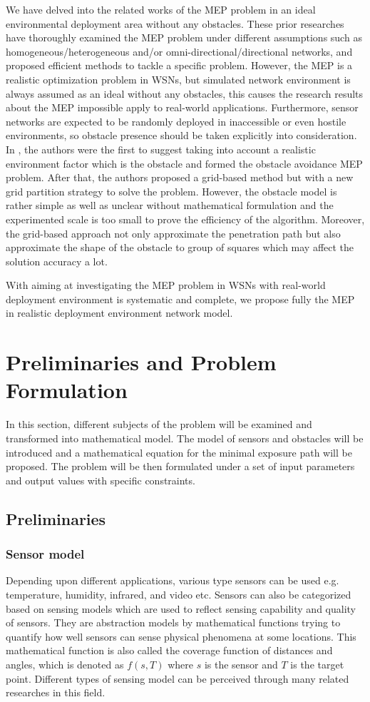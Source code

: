 \documentclass[final]{elsarticle}
\begin{document}
We have delved into the related works of the MEP problem in an ideal environmental deployment area without any obstacles. These prior researches have thoroughly examined the MEP problem under different assumptions such as homogeneous/heterogeneous and/or omni-directional/directional networks, and proposed efficient methods to tackle a specific problem. However, the MEP is a realistic optimization problem in WSNs, but simulated network environment is always assumed as an ideal without any obstacles, this causes the research results about the MEP impossible apply to real-world applications. Furthermore, sensor networks are expected to be randomly deployed in inaccessible or even hostile environments, so obstacle presence should be taken explicitly into consideration. In \cite{liu2017obstacle}, the authors were the first to suggest taking into account a realistic environment factor which is the obstacle and formed the obstacle avoidance MEP problem. After that, the authors proposed a grid-based method but with a new grid partition strategy to solve the problem. However, the obstacle model is rather simple as well as unclear without mathematical formulation and the experimented scale is too small to prove the efficiency of the algorithm. Moreover, the grid-based approach not only approximate the penetration path but also approximate the shape of the obstacle to group of squares which may affect the solution accuracy a lot.

With aiming at investigating the MEP problem in WSNs with real-world deployment environment is systematic and complete, we propose fully the MEP in realistic deployment environment network model. 
\section{Preliminaries and Problem Formulation}
In this section, different subjects of the problem will be examined and transformed into mathematical model. The model of sensors and obstacles will be introduced and a mathematical equation for the minimal exposure path will be proposed. The problem will be then formulated under a set of input parameters and output values with specific constraints.
\subsection{Preliminaries}
\subsubsection{Sensor model}
Depending upon different applications, various type sensors can be used e.g. temperature, humidity, infrared, and video etc. Sensors can also be categorized based on sensing models which are used to reflect sensing capability and quality of sensors. They are abstraction models by mathematical functions trying to quantify how well sensors can sense physical phenomena at some locations. This mathematical function is also called the coverage function of distances and angles, which is denoted as $f(s, T)$ where $ s $ is the sensor and $ T $ is the target point. Different types of sensing model can be perceived through many related researches in this field.
\end{document}
